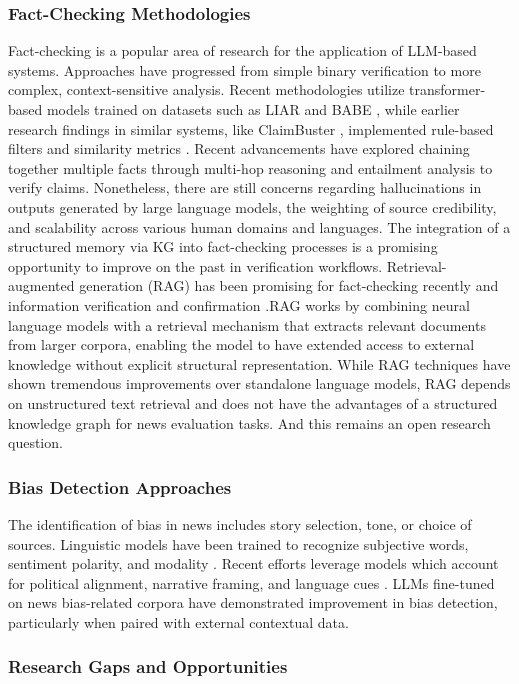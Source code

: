 \documentclass[11pt]{article}
\begin{document}
\subsubsection{Fact-Checking Methodologies}
Fact-checking is a popular area of research for the application of LLM-based systems. Approaches have progressed from simple binary verification to more complex, context-sensitive analysis. Recent methodologies utilize transformer-based models trained on datasets such as LIAR\cite{r26} and BABE \cite{r27}, while earlier research findings in similar systems, like ClaimBuster \cite{r28}, implemented rule-based filters and similarity metrics \cite{r29}. Recent advancements have explored chaining together multiple facts through multi-hop reasoning and entailment analysis to verify claims\cite{r30, r31}. Nonetheless, there are still concerns regarding hallucinations in outputs generated by large language models, the
weighting of source credibility, and scalability across various human domains and languages. The integration of a structured memory via KG into fact-checking processes is a promising opportunity to improve on the past in verification workflows. Retrieval-augmented generation (RAG) has been promising for fact-checking recently and information verification and confirmation \cite{r32, r33}.RAG works by combining neural language models with a retrieval mechanism that extracts relevant documents from larger corpora, enabling the model to have extended access to external knowledge without explicit structural representation. While RAG techniques have shown tremendous improvements over standalone language models, RAG depends on unstructured text retrieval and does not have the advantages of a structured knowledge graph for news evaluation tasks. And this remains an open research question.

\subsubsection{Bias Detection Approaches}
The identification of bias in news includes story selection, tone, or choice of sources. Linguistic models have been trained to recognize subjective words, sentiment polarity, and modality \cite{r31}. Recent efforts leverage models which account for political alignment, narrative framing, and language cues \cite{r32}. LLMs fine-tuned on news bias-related corpora have demonstrated improvement in bias detection, particularly when paired with external contextual data.

\subsubsection{Research Gaps and Opportunities}
\end{document}
